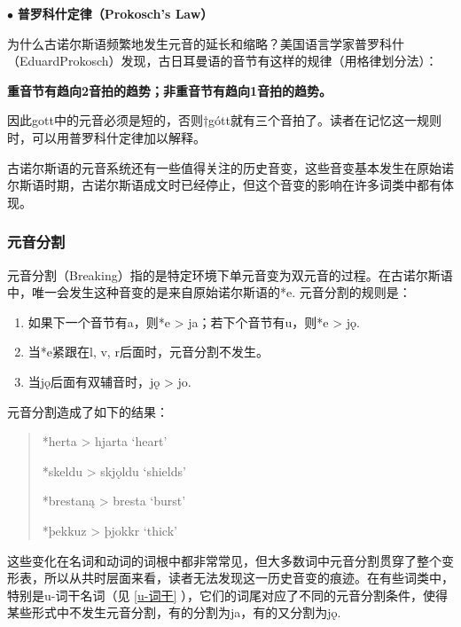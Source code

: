 \begin{info}
  $\bullet$ \textbf{普罗科什定律（Prokosch's Law）}

  \indent
  为什么古诺尔斯语频繁地发生元音的延长和缩略？美国语言学家普罗科什（EduardProkosch）发现，古日耳曼语的音节有这样的规律（用格律划分法）：

  \bigskip
  \indent
  \textbf{重音节有趋向2音拍的趋势；非重音节有趋向1音拍的趋势。}
  \bigskip

  \indent
  因此gott中的元音必须是短的，否则†gótt就有三个音拍了\footnotemark[3]。读者在记忆这一规则时，可以用普罗科什定律加以解释。
\end{info}


古诺尔斯语的元音系统还有一些值得关注的历史音变，这些音变基本发生在原始诺尔斯语时期，古诺尔斯语成文时已经停止，但这个音变的影响在许多词类中都有体现。

\subsubsection{元音分割}
\label{元音分割}

元音分割（Breaking）指的是特定环境下单元音变为双元音的过程。在古诺尔斯语中，唯一会发生这种音变的是来自原始诺尔斯语的*e. 元音分割的规则是：

\begin{info}
  \begin{enumerate}
    \item 如果下一个音节有a，则*e > ja；若下个音节有u，则*e > jǫ.
    \item 当*e紧跟在l, v, r后面时，元音分割不发生。
    \item 当jǫ后面有双辅音时，jǫ > jo.
  \end{enumerate}
\end{info}

元音分割造成了如下的结果：

\begin{quote}
  *herta > hjarta `heart'

  *skeldu > skjǫldu `shields'

  *brestaną > bresta `burst'

  *þekkuz > þjokkr `thick'
\end{quote}

这些变化在名词和动词的词根中都非常常见，但大多数词中元音分割贯穿了整个变形表，所以从共时层面来看，读者无法发现这一历史音变的痕迹。在有些词类中，特别是u-词干名词（见 \ref{u-词干} ），它们的词尾对应了不同的元音分割条件，使得某些形式中不发生元音分割，有的分割为ja，有的又分割为jǫ.

